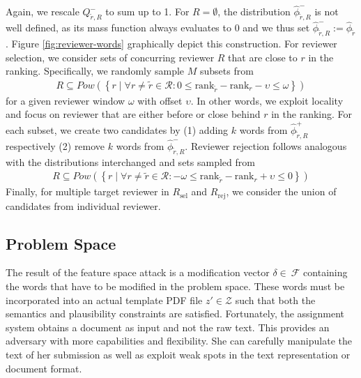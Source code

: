 \documentclass[letterpaper,twocolumn,10pt]{article}
\newcommand{\reviewersset}{\mathcal{R}}
\newcommand{\reviewersubset}{R}
\newcommand{\surroundingreviewers}{R}
\newcommand{\reviewer}{r}
\newcommand{\select}{\text{sel}}
\newcommand{\reject}{\text{rej}}
\newcommand{\requestedreviewers}{\reviewersubset_{\select}}
\newcommand{\rejectedreviewers}{\reviewersubset_{\reject}}
\newcommand{\reviewerwindow}{\omega}
\newcommand{\revieweroffset}{\upsilon}
\newcommand{\reviewerwordsmass}{Q}
\newcommand{\reviewerwords}{\hat{\topicworddist}}
\newcommand{\stepsize}{k}
\newcommand{\nosuccessors}{M}
\newcommand{\topicworddist}{\phi}
\newcommand{\modifications}{\delta}
\newcommand{\Dom}{\ensuremath{\mathcal{Z}}\xspace}
\newcommand{\F}{\ensuremath{\mathcal{F}}\xspace}
\newcommand{\inputpdf}{\ensuremath{z}\xspace}
\begin{document}
Again, we rescale $\reviewerwordsmass^-_{\tilde{\reviewer}, \surroundingreviewers}$ to sum up to 1. For $\surroundingreviewers = \emptyset$, the distribution $\reviewerwords^-_{\tilde{\reviewer}, \surroundingreviewers}$ is not well defined, as its {mass\EndAccSupp{}} function always evaluates to 0 and we thus set $\reviewerwords^-_{\tilde{\reviewer}, \surroundingreviewers} := \reviewerwords_{\tilde{\reviewer}}$. Figure \ref{fig:reviewer-words} graphically depict this construction.
For reviewer selection, we consider sets of concurring reviewer $\surroundingreviewers$ that are close to $\reviewer$ in the ranking. Specifically, we randomly sample $\nosuccessors$ subsets from
\begin{align*}
\surroundingreviewers \subseteq Pow(\left \{ \reviewer \mid \forall \reviewer \neq \tilde{\reviewer} \in \reviewersset: 0 \leq \text{rank}_{\tilde{\reviewer}} - \text{rank}_{\reviewer} - \revieweroffset \leq \reviewerwindow \right \})
\end{align*}
for a given reviewer window $\reviewerwindow$ with {offset\EndAccSupp{}} $\revieweroffset$. In other words, we exploit locality and focus on reviewer that are either before or close behind $\reviewer$ in the ranking.
For each subset, we create two candidates by (1) adding $\stepsize$ words from $\reviewerwords^+_{\tilde{\reviewer}, \surroundingreviewers}$ respectively (2) remove $\stepsize$ words from $\reviewerwords^-_{\tilde{\reviewer}, \surroundingreviewers}$. 
Reviewer rejection follows analogous with the distributions {interchanged\EndAccSupp{}} and sets sampled from
\begin{align*}
\surroundingreviewers \subseteq Pow(\left \{ \reviewer \mid \forall \reviewer \neq \tilde{\reviewer} \in \reviewersset: -\reviewerwindow \leq \text{rank}_{\tilde{\reviewer}} - \text{rank}_{\reviewer} + \revieweroffset \leq 0 \right \})
\end{align*}
Finally, for multiple target reviewer in $\requestedreviewers$ and $\rejectedreviewers$, we  consider the union of candidates from individual reviewer.

\subsection{Problem Space}
\label{sec:problem-space}

The result of the feature space attack is a modification vector $\modifications \in~\F$ containing the words that have to be modified in the problem space. These words must be incorporated into an actual template PDF file $\inputpdf' \in \Dom$ such that both the semantics and {plausibility\EndAccSupp{}} constraints are satisfied. 
Fortunately, the assignment system obtains a document as input and not the raw text. This provides an adversary with more capabilities and flexibility. She can carefully manipulate the text of her submission as well as exploit weak spots in the text representation or document format.
\end{document}
